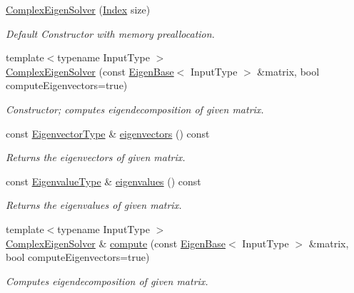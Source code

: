 \begin{DoxyCompactItemize}
\hyperlink{group___eigenvalues___module_a86751f64ebcd5c554551fb5eaaa02db7}{Complex\+Eigen\+Solver} (\hyperlink{group___eigenvalues___module_abc0218d8b902af0d6c759bfc0a8a8d74}{Index} size)
\begin{DoxyCompactList}\small\item\em Default Constructor with memory preallocation. \end{DoxyCompactList}\item 
{\footnotesize template$<$typename Input\+Type $>$ }\\\hyperlink{group___eigenvalues___module_a748de5c1e7f730e16421e6d451437600}{Complex\+Eigen\+Solver} (const \hyperlink{group___core___module_struct_eigen_1_1_eigen_base}{Eigen\+Base}$<$ Input\+Type $>$ \&matrix, bool compute\+Eigenvectors=true)
\begin{DoxyCompactList}\small\item\em Constructor; computes eigendecomposition of given matrix. \end{DoxyCompactList}\item 
const \hyperlink{group___eigenvalues___module_a67cd4d20590abfd86b2639c4c8ea3dd6}{Eigenvector\+Type} \& \hyperlink{group___eigenvalues___module_a3aa5e27800349990778da8fa532c1270}{eigenvectors} () const
\begin{DoxyCompactList}\small\item\em Returns the eigenvectors of given matrix. \end{DoxyCompactList}\item 
const \hyperlink{group___eigenvalues___module_ad3a663b1ff5200a098dabbbf9b7162b1}{Eigenvalue\+Type} \& \hyperlink{group___eigenvalues___module_a10c25c7620e7faedcd39991cce3a757b}{eigenvalues} () const
\begin{DoxyCompactList}\small\item\em Returns the eigenvalues of given matrix. \end{DoxyCompactList}\item 
{\footnotesize template$<$typename Input\+Type $>$ }\\\hyperlink{group___eigenvalues___module_class_eigen_1_1_complex_eigen_solver}{Complex\+Eigen\+Solver} \& \hyperlink{group___eigenvalues___module_aeb7e38c6db5369f5c974f3786e94c1f0}{compute} (const \hyperlink{group___core___module_struct_eigen_1_1_eigen_base}{Eigen\+Base}$<$ Input\+Type $>$ \&matrix, bool compute\+Eigenvectors=true)
\begin{DoxyCompactList}\small\item\em Computes eigendecomposition of given matrix. \end{DoxyCompactList}\item 

\end{DoxyCompactItemize}
